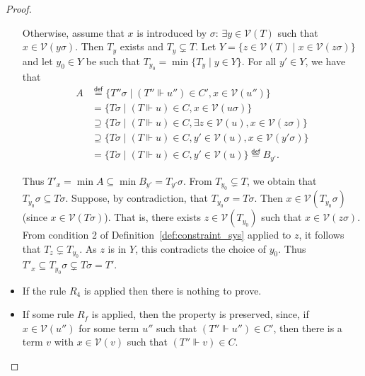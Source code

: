 \documentclass[acmtocl,acmnow]{acmtrans2m}
\newcommand{\var}{\mathcal{V}}
\newcommand{\eqdef}{\stackrel{\mathsf{def}}{=}}
\begin{document}
\begin{proof}
\begin{itemize}
Otherwise, assume that $x$ is introduced by $\sigma$: $\exists
y\in\var(T)$ such that $x\in\var(y\sigma)$. Then $T_y$ exists and
$T_y\subsetneq T$. 
Let $Y=\{z\in\var(T) \mid x\in\var(z\sigma)\}$ and 
let $y_0\in Y$ be such that $T_{y_0}=\min\{T_y \mid y\in Y\}$.
For all $y'\in Y$, we have that 
\begin{align*}
A & \eqdef \{T''\sigma \mid (T''\Vdash u'') \in C', x\in\var(u'')\}  \\
  & = \{T\sigma \mid (T\Vdash u) \in C, x\in\var(u\sigma)\}  \\
  & \supseteq \{T\sigma \mid (T\Vdash u) \in C, \exists z\in\var(u), x\in\var(z\sigma)\}  \\
  & \supseteq \{T\sigma \mid (T\Vdash u) \in C, y'\in\var(u), x\in\var(y'\sigma)\}  \\
  & = \{T\sigma \mid (T\Vdash u) \in C, y'\in\var(u)\} \eqdef B_{y'}.
\end{align*}

Thus $T'_x=\min A \subseteq \min B_{y'}=T_{y'}\sigma$.  From
$T_{y_0}\subsetneq T$, we obtain that $T_{y_0}\sigma\subseteq
T\sigma$. Suppose, by contradiction, that $T_{y_0}\sigma = T\sigma$. Then
$x\in\var(T_{y_0}\sigma)$ (since $x\in\var(T\sigma)$). That is, there
exists $z\in\var(T_{y_0})$ such that $x\in\var(z\sigma)$. From condition 2
of Definition~\ref{def:constraint_sys} applied to $z$, it follows that
$T_z\subsetneq T_{y_0}$. As $z$ is in $Y$, this contradicts the choice
of $y_0$.  Thus $T'_x\subseteq T_{y_0}\sigma\subsetneq T\sigma=T'$.

\item If the rule $R_4$ is applied then there is nothing to prove.

\item If some rule $R_f$ is applied, then the property is preserved, since, if $x\in \var(u'')$ for some term
$u''$ such that $(T''\Vdash u'')\in C'$, then there is a term $v$ with $x\in\var(v)$ such that $(T''\Vdash v)\in C$.
\end{itemize}
\end{proof}
\end{document}
